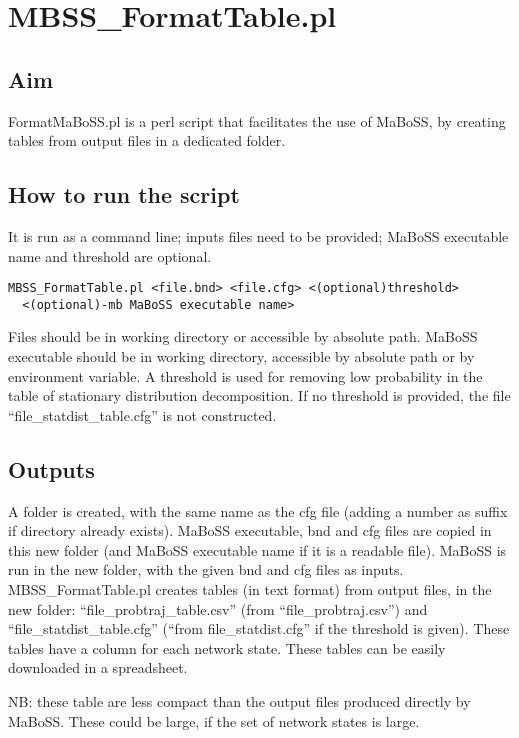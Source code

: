\documentclass{article}
\begin{document}
\section*{MBSS\_FormatTable.pl}
\subsection*{Aim}
FormatMaBoSS.pl is a perl script that facilitates the use of MaBoSS, by creating tables from output files in a dedicated folder.
\subsection*{How to run the script}
It is run as a command line; inputs files need to be provided; MaBoSS executable name and threshold are optional.
\begin{verbatim}
MBSS_FormatTable.pl <file.bnd> <file.cfg> <(optional)threshold> 
  <(optional)-mb MaBoSS executable name>
\end{verbatim}

Files should be in working directory or accessible by absolute path.
MaBoSS executable should be in working directory, accessible by absolute path or by environment variable. 
A threshold is used for removing low probability in the table of stationary distribution decomposition. If no threshold is provided, the file ``file\_statdist\_table.cfg'' is not constructed.

\subsection*{Outputs}
A folder is created, with the same name as the cfg file (adding a number as suffix if directory already exists). MaBoSS executable, bnd and cfg files are copied in this new folder (and MaBoSS executable name if it is a readable file).
MaBoSS is run in the new folder, with the given bnd and cfg files as inputs. MBSS\_FormatTable.pl creates tables (in text format) from output files, in the new folder: ``file\_probtraj\_table.csv'' (from ``file\_probtraj.csv'')  and ``file\_statdist\_table.cfg'' (``from file\_statdist.cfg'' if the threshold is given). These tables have a column for each network state. These tables can be easily downloaded in a spreadsheet.

 NB: these table are less compact than the output files produced directly by MaBoSS. These could be large, if the set of network states is large.
\end{document}
